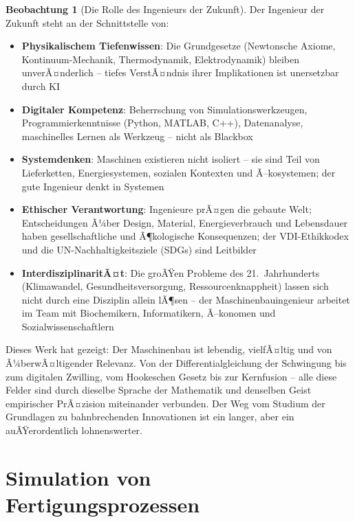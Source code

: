 ﻿\documentclass[a4paper,12pt]{report}
\theoremstyle{definition}
\newtheorem{beobachtung}{Beobachtung}
\begin{document}
\begin{beobachtung}[Die Rolle des Ingenieurs der Zukunft]
Der Ingenieur der Zukunft steht an der Schnittstelle von:
\begin{itemize}
    \item[-] \textbf{Physikalischem Tiefenwissen}: Die Grundgesetze
          (Newtonsche Axiome, Kontinuum-Mechanik, Thermodynamik, Elektrodynamik)
          bleiben unverÃ¤nderlich -- tiefes VerstÃ¤ndnis ihrer Implikationen
          ist unersetzbar durch KI
    \item[-] \textbf{Digitaler Kompetenz}: Beherrschung von Simulationswerkzeugen,
          Programmierkenntnisse (Python, MATLAB, C++), Datenanalyse,
          maschinelles Lernen als Werkzeug -- nicht als Blackbox
    \item[-] \textbf{Systemdenken}: Maschinen existieren nicht isoliert --
          sie sind Teil von Lieferketten, Energiesystemen, sozialen Kontexten
          und Ã–kosystemen; der gute Ingenieur denkt in Systemen
    \item[-] \textbf{Ethischer Verantwortung}: Ingenieure prÃ¤gen die
          gebaute Welt; Entscheidungen Ã¼ber Design, Material, Energieverbrauch
          und Lebensdauer haben gesellschaftliche und Ã¶kologische Konsequenzen;
          der VDI-Ethikkodex und die UN-Nachhaltigkeitsziele (SDGs) sind Leitbilder
    \item[-] \textbf{InterdisziplinaritÃ¤t}: Die groÃŸen Probleme des 21.\ Jahrhunderts
          (Klimawandel, Gesundheitsversorgung, Ressourcenknappheit) lassen sich
          nicht durch eine Disziplin allein lÃ¶sen -- der Maschinenbauingenieur
          arbeitet im Team mit Biochemikern, Informatikern, Ã–konomen und Sozialwissenschaftlern
\end{itemize}

\medskip
Dieses Werk hat gezeigt: Der Maschinenbau ist lebendig, vielfÃ¤ltig
und von Ã¼berwÃ¤ltigender Relevanz. Von der Differentialgleichung
der Schwingung bis zum digitalen Zwilling, vom Hookeschen Gesetz
bis zur Kernfusion -- alle diese Felder sind durch dieselbe
Sprache der Mathematik und denselben Geist empirischer PrÃ¤zision
miteinander verbunden. Der Weg vom Studium der Grundlagen
zu bahnbrechenden Innovationen ist ein langer, aber ein auÃŸerordentlich
lohnenswerter.
\end{beobachtung}


\section{Simulation von Fertigungsprozessen}
\end{document}
